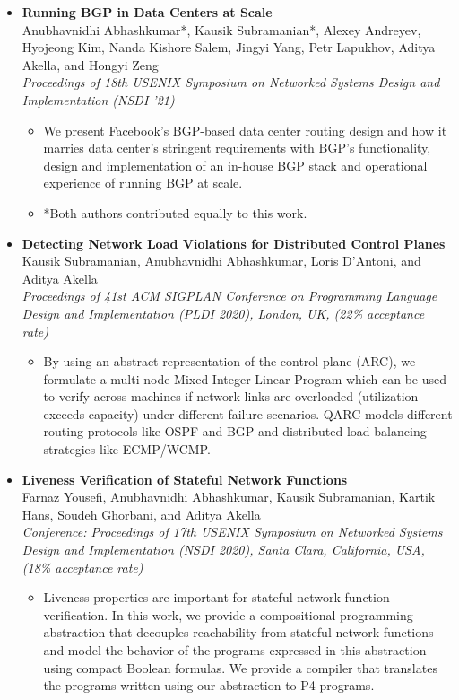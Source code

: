 \documentclass[11pt,a4paper,sans]{moderncv}        %
\begin{document}
\begin{itemize}
	\item \textbf{Running BGP in Data Centers at Scale} \\
	Anubhavnidhi Abhashkumar*, Kausik Subramanian*, Alexey Andreyev, Hyojeong Kim,
	Nanda Kishore Salem, Jingyi Yang, Petr Lapukhov, Aditya Akella, and Hongyi Zeng\\
	\emph{Proceedings of 18th USENIX Symposium on Networked Systems Design and Implementation (NSDI '21)}
	\begin{itemize}
		\item We present Facebook’s BGP-based data center routing design and how it marries data center’s stringent
		requirements with BGP’s functionality, design and implementation of an in-house BGP stack and operational 
		experience of running BGP at scale.
		\item *Both authors contributed equally to this work.
	\end{itemize}
	\vspace*{4mm}
	
	\item \textbf{Detecting Network Load Violations for Distributed Control Planes} \\
	\underline{Kausik Subramanian}, Anubhavnidhi Abhashkumar, Loris D’Antoni, and Aditya Akella \\
	\emph{Proceedings of 41st ACM SIGPLAN Conference on Programming Language Design and Implementation (PLDI 2020), London, UK, (22\% acceptance rate)}
	\begin{itemize}
		\item By using an abstract representation of the control plane (ARC), we
		formulate a multi-node Mixed-Integer Linear Program which can be used to
		verify across machines if network links are overloaded (utilization
		exceeds capacity) under different failure scenarios. QARC models
		different routing protocols like OSPF and BGP and distributed load
		balancing strategies like ECMP/WCMP.
	\end{itemize}
	\vspace*{4mm}

	\item \textbf{Liveness Verification of Stateful Network Functions} \\
	Farnaz Yousefi, Anubhavnidhi Abhashkumar, \underline{Kausik Subramanian}, Kartik Hans, Soudeh Ghorbani, and Aditya Akella \\
	\emph{Conference: Proceedings of 17th USENIX Symposium on Networked Systems Design and Implementation (NSDI 2020), Santa Clara, California, USA, (18\% acceptance rate)}
	\begin{itemize}
		\item Liveness properties are important for stateful network function verification.
		In this work, we provide a compositional programming abstraction that decouples
		reachability from stateful network functions and model the behavior of the
		programs expressed in
		this abstraction using compact Boolean formulas.
		We provide a compiler that translates the
		programs written using our abstraction to P4 programs.
	\end{itemize}
	\vspace*{4mm}


\end{itemize}
\end{document}
